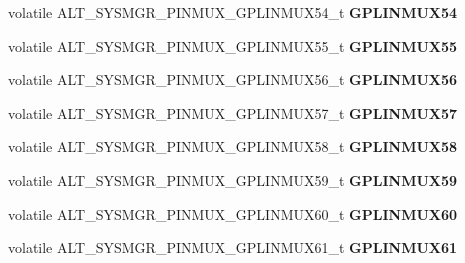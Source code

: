 \begin{DoxyCompactItemize}
volatile A\+L\+T\+\_\+\+S\+Y\+S\+M\+G\+R\+\_\+\+P\+I\+N\+M\+U\+X\+\_\+\+G\+P\+L\+I\+N\+M\+U\+X54\+\_\+t {\bfseries G\+P\+L\+I\+N\+M\+U\+X54}
\item 
\mbox{\label{structALT__SYSMGR__PINMUX__s_a6a798fd7347c8a6adec0b47dbee0660c}} 
volatile A\+L\+T\+\_\+\+S\+Y\+S\+M\+G\+R\+\_\+\+P\+I\+N\+M\+U\+X\+\_\+\+G\+P\+L\+I\+N\+M\+U\+X55\+\_\+t {\bfseries G\+P\+L\+I\+N\+M\+U\+X55}
\item 
\mbox{\label{structALT__SYSMGR__PINMUX__s_a33d53e7339512f72b75f355cdddd0f0a}} 
volatile A\+L\+T\+\_\+\+S\+Y\+S\+M\+G\+R\+\_\+\+P\+I\+N\+M\+U\+X\+\_\+\+G\+P\+L\+I\+N\+M\+U\+X56\+\_\+t {\bfseries G\+P\+L\+I\+N\+M\+U\+X56}
\item 
\mbox{\label{structALT__SYSMGR__PINMUX__s_abcfb95f337412bf6ed74f39d943850ca}} 
volatile A\+L\+T\+\_\+\+S\+Y\+S\+M\+G\+R\+\_\+\+P\+I\+N\+M\+U\+X\+\_\+\+G\+P\+L\+I\+N\+M\+U\+X57\+\_\+t {\bfseries G\+P\+L\+I\+N\+M\+U\+X57}
\item 
\mbox{\label{structALT__SYSMGR__PINMUX__s_a5257c9f1580b3694349590c7ac14e4e6}} 
volatile A\+L\+T\+\_\+\+S\+Y\+S\+M\+G\+R\+\_\+\+P\+I\+N\+M\+U\+X\+\_\+\+G\+P\+L\+I\+N\+M\+U\+X58\+\_\+t {\bfseries G\+P\+L\+I\+N\+M\+U\+X58}
\item 
\mbox{\label{structALT__SYSMGR__PINMUX__s_afe4e76b84831c10ec026bb5a72ee4f55}} 
volatile A\+L\+T\+\_\+\+S\+Y\+S\+M\+G\+R\+\_\+\+P\+I\+N\+M\+U\+X\+\_\+\+G\+P\+L\+I\+N\+M\+U\+X59\+\_\+t {\bfseries G\+P\+L\+I\+N\+M\+U\+X59}
\item 
\mbox{\label{structALT__SYSMGR__PINMUX__s_a47e01fbe2ac75f7c34fead1023a23238}} 
volatile A\+L\+T\+\_\+\+S\+Y\+S\+M\+G\+R\+\_\+\+P\+I\+N\+M\+U\+X\+\_\+\+G\+P\+L\+I\+N\+M\+U\+X60\+\_\+t {\bfseries G\+P\+L\+I\+N\+M\+U\+X60}
\item 
\mbox{\label{structALT__SYSMGR__PINMUX__s_a1f03f3e1a8c0e3e95cfd1edff9b1a83c}} 
volatile A\+L\+T\+\_\+\+S\+Y\+S\+M\+G\+R\+\_\+\+P\+I\+N\+M\+U\+X\+\_\+\+G\+P\+L\+I\+N\+M\+U\+X61\+\_\+t {\bfseries G\+P\+L\+I\+N\+M\+U\+X61}
\item 
\mbox{\label{structALT__SYSMGR__PINMUX__s_a9e9d066b04639439c837cd365a92cc6d}} 

\end{DoxyCompactItemize}
